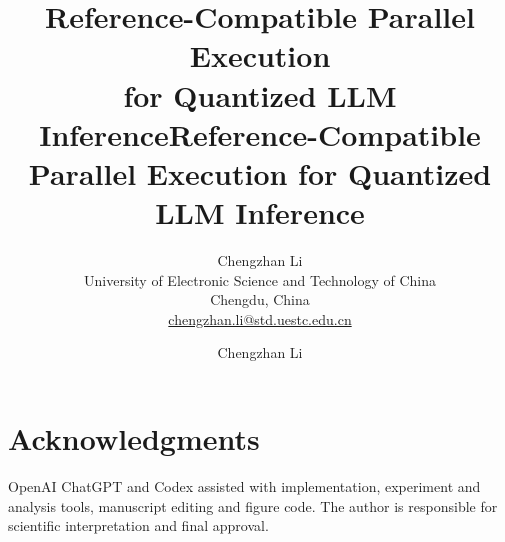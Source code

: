 \documentclass[10pt,journal,compsoc]{IEEEtran}
\begin{document}
\ifdefined\arxivReadable
\title{Reference-Compatible Parallel Execution\\for Quantized LLM Inference}
\author{Chengzhan Li\\[3pt]\small University of Electronic Science and Technology of China\\Chengdu, China\\\href{mailto:chengzhan.li@std.uestc.edu.cn}{chengzhan.li@std.uestc.edu.cn}}
\else
\title{Reference-Compatible Parallel Execution for Quantized LLM Inference}
\author{Chengzhan Li}
\fi
{}
\maketitle
\IEEEdisplaynontitleabstractindextext







\section*{Acknowledgments}
OpenAI ChatGPT and Codex assisted with implementation, experiment and analysis tools, manuscript editing and figure code. The author is responsible for scientific interpretation and final approval.


\label{lastmainpage}
\ifdefined{}
\clearpage

\fi
\end{document}
